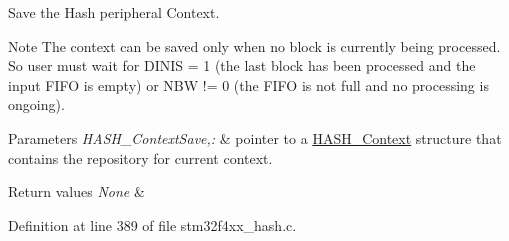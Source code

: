 Save the Hash peripheral Context. 

\begin{DoxyNote}{Note}
The context can be saved only when no block is currently being processed. So user must wait for D\-I\-N\-I\-S = 1 (the last block has been processed and the input F\-I\-F\-O is empty) or N\-B\-W != 0 (the F\-I\-F\-O is not full and no processing is ongoing). 
\end{DoxyNote}

\begin{DoxyParams}{Parameters}
{\em H\-A\-S\-H\-\_\-\-Context\-Save,\-:} & pointer to a \hyperlink{struct_h_a_s_h___context}{H\-A\-S\-H\-\_\-\-Context} structure that contains the repository for current context. \\
\hline
\end{DoxyParams}

\begin{DoxyRetVals}{Return values}
{\em None} & \\
\hline
\end{DoxyRetVals}


Definition at line 389 of file stm32f4xx\-\_\-hash.\-c.

